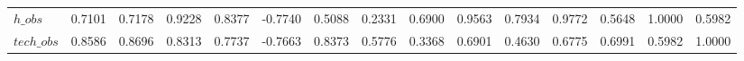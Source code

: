 \begin{center}
\begin{longtable}{lcccccccccccccc}
$h\_obs         $	 & 	           0.7101	 & 	           0.7178	 & 	           0.9228	 & 	           0.8377	 & 	          -0.7740	 & 	           0.5088	 & 	           0.2331	 & 	           0.6900	 & 	           0.9563	 & 	           0.7934	 & 	           0.9772	 & 	           0.5648	 & 	           1.0000	 & 	           0.5982 \\ 
$tech\_obs      $	 & 	           0.8586	 & 	           0.8696	 & 	           0.8313	 & 	           0.7737	 & 	          -0.7663	 & 	           0.8373	 & 	           0.5776	 & 	           0.3368	 & 	           0.6901	 & 	           0.4630	 & 	           0.6775	 & 	           0.6991	 & 	           0.5982	 & 	           1.0000 \\ 
\end{longtable}
 \end{center}
